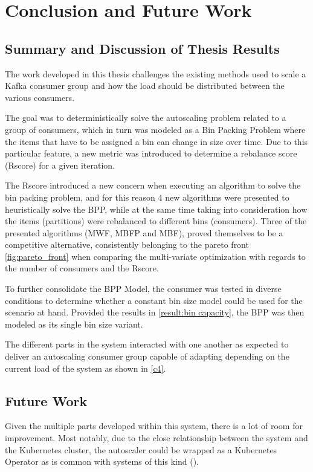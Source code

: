 \chapter{Conclusion and Future Work} 
\label{chap:conclusions}

\section{Summary and Discussion of Thesis Results}

The work developed in this thesis challenges the existing methods used to scale a Kafka consumer group and how the load should be distributed between the various consumers.

The goal was to deterministically solve the autoscaling problem related to a group of consumers, which in turn was modeled as a Bin Packing Problem where the items that have to be assigned a bin can change in size over time. Due to this particular feature, a new metric was introduced to determine a rebalance score (Rscore) for a given iteration. 

The Rscore introduced a new concern when executing an algorithm to solve the bin packing problem, and for this reason 4 new algorithms were presented to heuristically solve the BPP, while at the same time taking into consideration how the items (partitions) were rebalanced to different bins (consumers). Three of the presented algorithms (MWF, MBFP and MBF), proved themselves to be a competitive alternative, consistently belonging to the pareto front \ref{fig:pareto_front} when comparing the multi-variate optimization with regards to the number of consumers and the Rscore.

To further consolidate the BPP Model, the consumer was tested in diverse conditions to determine whether a constant bin size model could be used for the scenario at hand. Provided the results in \ref{result:bin capacity}, the BPP was then modeled as its single bin size variant.

The different parts in the system interacted with one another as expected to deliver an autoscaling consumer group capable of adapting depending on the current load of the system as shown in \ref{c4}.

\section{Future Work}

Given the multiple parts developed within this system, there is a lot of room for improvement. Most notably, due to the close relationship between the system and the Kubernetes cluster, the autoscaler could be wrapped as a Kubernetes Operator \cite{KuberenetesOperator} as is common with systems of this kind (\cite{Kubegres, PulumiOperator, KEDA}).

